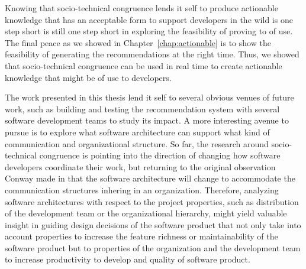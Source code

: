 Knowing that socio-technical congruence lends it self to produce actionable knowledge that has an acceptable form to support developers in the wild is one step short is still one step short in exploring the feasibility of proving to of use.
The final peace as we showed in Chapter~\ref{chap:actionable} is to show the feasibility of generating the recommendations at the right time.
Thus, we showed that socio-technical congruence can be used in real time to create actionable knowledge that might be of use to developers.

The work presented in this thesis lend it self to several obvious venues of future work, such as building and testing the recommendation system with several software development teams to study its impact.
A more interesting avenue to pursue is to explore what software architecture can support what kind of communication and organizational structure.
So far, the research around socio-technical congruence is pointing into the direction of changing how software developers coordinate their work, but returning to the original observation Conway made in that the software architecture will change to accommodate the communication structures inhering in an organization.
Therefore, analyzing software architectures with respect to the project properties, such as distribution of the development team or the organizational hierarchy, might yield valuable insight in guiding design decisions of the software product that not only take into account properties to increase the feature richness or maintainability of the software product but to properties of the organization and the development team to increase productivity to develop and quality of software product. 
